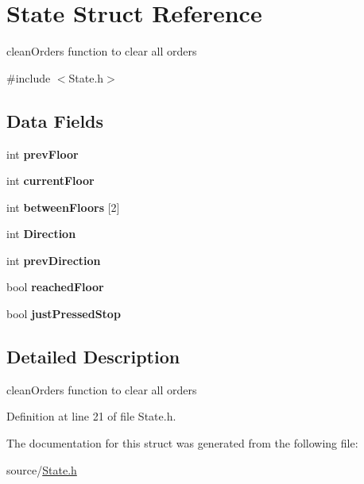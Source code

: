 \hypertarget{structState}{}\section{State Struct Reference}
\label{structState}


clean\+Orders function to clear all orders  




{\ttfamily \#include $<$State.\+h$>$}

\subsection*{Data Fields}
\begin{DoxyCompactItemize}
\item 
\mbox{\label{structState_a9a4974e82bc7b99af7715b3189487a31}} 
int {\bfseries prev\+Floor}
\item 
\mbox{\label{structState_a4cd2ebda127f8b9823eba7c826b10a75}} 
int {\bfseries current\+Floor}
\item 
\mbox{\label{structState_a3b31c590da55414522eff4e78446a16a}} 
int {\bfseries between\+Floors} \mbox{[}2\mbox{]}
\item 
\mbox{\label{structState_a832d2d78380f35e196d9d5852745e443}} 
int {\bfseries Direction}
\item 
\mbox{\label{structState_a43387fbee52a7c410724b9e11c07de4c}} 
int {\bfseries prev\+Direction}
\item 
\mbox{\label{structState_a5a3c5e72dd33c732d2e46bb48724958a}} 
bool {\bfseries reached\+Floor}
\item 
\mbox{\label{structState_a642e64c36e8b5e5c6f0d3ffb1f569b9e}} 
bool {\bfseries just\+Pressed\+Stop}
\end{DoxyCompactItemize}


\subsection{Detailed Description}
clean\+Orders function to clear all orders 

Definition at line 21 of file State.\+h.



The documentation for this struct was generated from the following file\+:\begin{DoxyCompactItemize}
\item 
source/\hyperlink{State_8h}{State.\+h}\end{DoxyCompactItemize}
